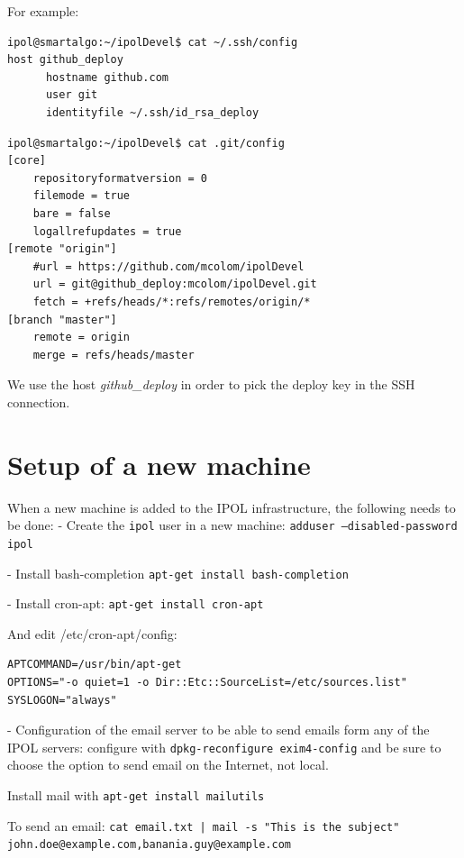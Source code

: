 \documentclass[a4paper,12pt]{article}
\begin{document}
For example:

\begin{verbatim}
ipol@smartalgo:~/ipolDevel$ cat ~/.ssh/config 
host github_deploy
      hostname github.com
      user git
      identityfile ~/.ssh/id_rsa_deploy
\end{verbatim}

\vspace{0.15cm}

\begin{verbatim}
ipol@smartalgo:~/ipolDevel$ cat .git/config 
[core]
	repositoryformatversion = 0
	filemode = true
	bare = false
	logallrefupdates = true
[remote "origin"]
	#url = https://github.com/mcolom/ipolDevel
	url = git@github_deploy:mcolom/ipolDevel.git
	fetch = +refs/heads/*:refs/remotes/origin/*
[branch "master"]
	remote = origin
	merge = refs/heads/master
\end{verbatim}

We use the host \emph{github\_deploy} in order to pick the deploy key in the SSH connection.

\section{Setup of a new machine}
When a new machine is added to the IPOL infrastructure, the following needs to be done:
- Create the {\tt ipol} user in a new machine: {\tt adduser --disabled-password ipol}

- Install bash-completion {\tt apt-get install bash-completion}

- Install cron-apt: {\tt apt-get install cron-apt}

And edit /etc/cron-apt/config:
\begin{verbatim}
APTCOMMAND=/usr/bin/apt-get
OPTIONS="-o quiet=1 -o Dir::Etc::SourceList=/etc/sources.list"
SYSLOGON="always"
\end{verbatim}

- Configuration of the email server to be able to send emails form any of the IPOL servers: configure with {\tt dpkg-reconfigure exim4-config} and be sure to choose the option to send email on the Internet, not local.

Install mail with {\tt apt-get install mailutils}

To send an email: {\tt cat email.txt | mail -s "This is the subject" john.doe@example.com,banania.guy@example.com}
\end{document}
